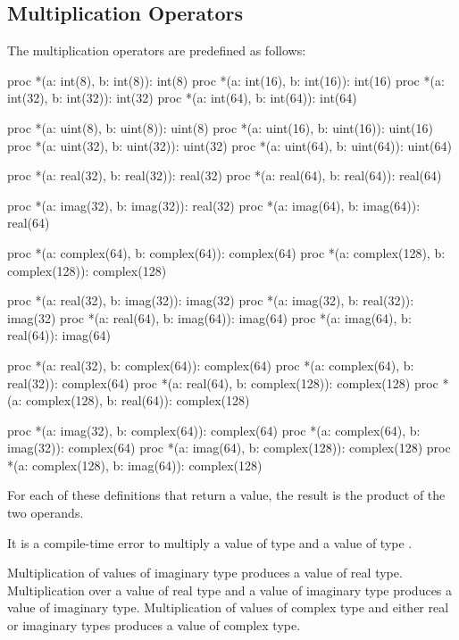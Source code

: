 \subsection{Multiplication Operators}
\label{Multiplication_Operators}

The multiplication operators are predefined as follows:
\begin{chapel}
proc *(a: int(8), b: int(8)): int(8)
proc *(a: int(16), b: int(16)): int(16)
proc *(a: int(32), b: int(32)): int(32)
proc *(a: int(64), b: int(64)): int(64)

proc *(a: uint(8), b: uint(8)): uint(8)
proc *(a: uint(16), b: uint(16)): uint(16)
proc *(a: uint(32), b: uint(32)): uint(32)
proc *(a: uint(64), b: uint(64)): uint(64)

proc *(a: real(32), b: real(32)): real(32)
proc *(a: real(64), b: real(64)): real(64)

proc *(a: imag(32), b: imag(32)): real(32)
proc *(a: imag(64), b: imag(64)): real(64)

proc *(a: complex(64), b: complex(64)): complex(64)
proc *(a: complex(128), b: complex(128)): complex(128)

proc *(a: real(32), b: imag(32)): imag(32)
proc *(a: imag(32), b: real(32)): imag(32)
proc *(a: real(64), b: imag(64)): imag(64)
proc *(a: imag(64), b: real(64)): imag(64)

proc *(a: real(32), b: complex(64)): complex(64)
proc *(a: complex(64), b: real(32)): complex(64)
proc *(a: real(64), b: complex(128)): complex(128)
proc *(a: complex(128), b: real(64)): complex(128)

proc *(a: imag(32), b: complex(64)): complex(64)
proc *(a: complex(64), b: imag(32)): complex(64)
proc *(a: imag(64), b: complex(128)): complex(128)
proc *(a: complex(128), b: imag(64)): complex(128)
\end{chapel}
For each of these definitions that return a value, the result is the
product of the two operands.

It is a compile-time error to multiply a value of type  and
a value of type .

Multiplication of values of imaginary type produces a value of real
type.  Multiplication over a value of real type and a value of
imaginary type produces a value of imaginary type.  Multiplication of
values of complex type and either real or imaginary types produces a
value of complex type.

